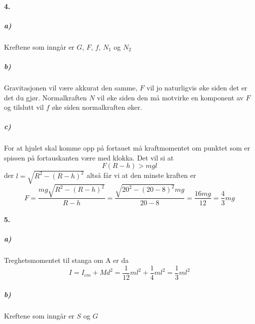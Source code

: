 \documentclass[11pt, A4paper,norsk]{article}
\begin{document}
		\paragraph{4.}
			\subparagraph{a)}
				\begin{flushleft}
Kreftene som inngår er $G$, $F$, $f$, $N_1$ og $N_2$
				\end{flushleft}










			\subparagraph{b)}
				\begin{flushleft}
Gravitasjonen vil være akkurat den samme, $F$ vil jo naturligvis øke siden det er det du gjør. Normalkraften $N$ vil øke siden den må motvirke en komponent av $F$ og tilslutt vil $f$ øke siden normalkraften øker.
				\end{flushleft}









			\subparagraph{c)}
				\begin{flushleft}
For at hjulet skal komme opp på fortauet må kraftmomentet om punktet som er spissen på fortauskanten være med klokka. Det vil si at
$$F(R - h) > mgl$$
der $l = \sqrt{R^2 - (R - h)^2}$ altså får vi at den minste kraften er
$$F = \frac{mg\sqrt{R^2 - (R - h)^2}}{R - h} = \frac{\sqrt{20^2 - (20 - 8)^2} mg}{20 - 8} = \frac{16mg}{12} = \frac{4}{3}mg$$
				\end{flushleft}











		\paragraph{5.}
			\subparagraph{a)}
				\begin{flushleft}
Treghetsmomentet til stanga om A er da
$$I = I_{cm} + Md^2 = \frac{1}{12} m l^2 + \frac{1}{4}ml^2 = \frac{1}{3}ml^2$$
				\end{flushleft}












			\subparagraph{b)}
				\begin{flushleft}
Kreftene som inngår er $S$ og $G$
				\end{flushleft}
\end{document}
